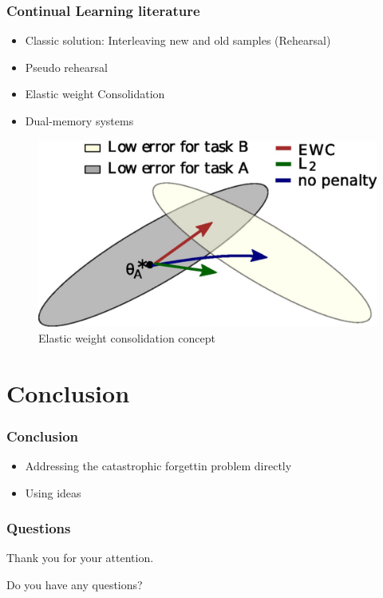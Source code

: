 \documentclass{beamer}
\theoremstyle{remark}
\theoremstyle{plain}
\begin{document}
\begin{frame}
 \frametitle{Continual Learning literature}
\begin{itemize}
    \item Classic solution: Interleaving new and old samples (Rehearsal)
    \item Pseudo rehearsal \cite{RobinsConsolidationBrain}
    \item Elastic weight Consolidation \cite{Kirkpatrick2017OvercomingNetworks.}
    \item Dual-memory systems \cite{Parisi2018ContinualReview}
\end{itemize}
\begin{figure}
    \centering
    \includegraphics[scale=0.6]{figs/ewc.jpg}
    \caption{Elastic weight consolidation concept}
    \label{fig:my_label}
\end{figure}
  
\end{frame}


\section{Conclusion}
\label{sec:continual}
\begin{frame}
\frametitle{Conclusion}
\begin{itemize}
    \item Addressing the catastrophic forgettin problem directly
    \item Using ideas 
\end{itemize}
\end{frame}



\begin{frame}
  \frametitle{Questions}
  \begin{center}
    Thank you for your attention.

    Do you have any questions?
  \end{center}
\end{frame}
\end{document}
